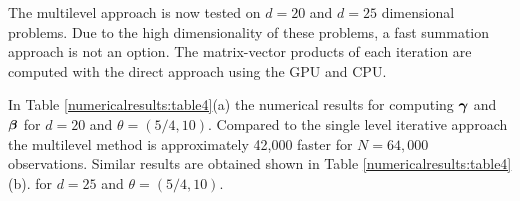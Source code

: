 \documentclass[11pt,final]{amsart}       %
\begin{document}
\begin{table*}[htbp]
\begin{center}
\begin{tabular} { r r r r r c r}
\end{tabular}
\end{center}
\label{numericalresults:table3}
\end{table*}


The multilevel approach is now tested on $d = 20$ and $d = 25$
dimensional problems. Due to the high dimensionality of these
problems, a fast summation approach is not an option. The
matrix-vector products of each iteration are computed with the direct
approach using the GPU and CPU.

In Table \ref{numericalresults:table4}(a) the numerical results for
computing $\boldsymbol{\gamma}$ and $\boldsymbol{\beta}$ for $d = 20$ and $\theta =(5/4,10)$.
Compared to the single level iterative approach the multilevel method
is approximately 42,000 faster for $N = 64,000$ observations. Similar
results are obtained shown in Table \ref{numericalresults:table4}(b). 
for $d = 25$ and $\theta =(5/4,10)$.

\setlength{\tabcolsep}{3pt}
\end{document}
